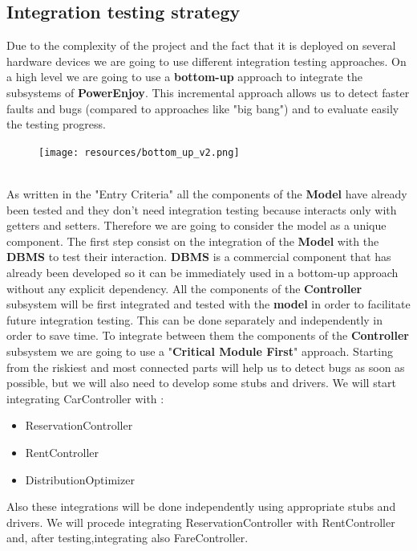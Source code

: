 \subsection{Integration testing strategy}
Due to the complexity of the project and the fact that it is deployed on several hardware devices we are going to use different integration testing approaches.
On a high level we are going to use a \textbf{bottom-up} approach to integrate the subsystems of \textbf{PowerEnjoy}. This incremental approach allows us to detect faster faults and bugs (compared to approaches like "big bang") and to evaluate easily the testing progress.
\begin{figure}[hp]
  \centering
  \texttt{[image: resources/bottom\_up\_v2.png]}
  \label{fig:bottom_up}
\end{figure}
\\
As written in the "Entry Criteria" all the components of the \textbf{Model} have already been tested and  they don't need integration testing because interacts only with getters and setters. 
Therefore we are going to consider the model as a unique component.\newline
The first step consist on the integration of the \textbf{Model} with the \textbf{DBMS} to test their interaction. \textbf{DBMS} is a commercial component that has already been developed so it can be immediately used in a bottom-up approach without any explicit dependency.
All the components of the \textbf{Controller} subsystem will be first integrated and tested with the \textbf{model} in order to facilitate future integration testing. This can be done separately and independently in order to save time.\newline
To integrate between them the components of the \textbf{Controller} subsystem we are going to 
use a "\textbf{Critical Module First}" approach. Starting from the riskiest and most connected parts will help us to detect bugs as soon as possible, but we will also need to develop some stubs and drivers.
We will start integrating CarController with :
\begin{itemize}
\item ReservationController
\item RentController
\item DistributionOptimizer
\end{itemize}
Also these integrations will be done independently using appropriate stubs and drivers.
We will procede integrating ReservationController with RentController and, after testing,integrating also FareController.

